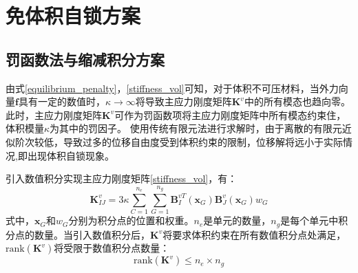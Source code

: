 \section{免体积自锁方案}
\subsection{罚函数法与缩减积分方案}

由式\eqref{equilibrium_penalty}，\eqref{stiffness_vol}可知，对于体积不可压材料，当外力向量$\boldsymbol f$具有一定的数值时，$\kappa \rightarrow \infty$将导致主应力刚度矩阵$\boldsymbol K^v$中的所有模态也趋向零。
此时，主应力刚度矩阵$\boldsymbol K^v$可作为罚函数项将主应力刚度矩阵中所有模态约束住，体积模量$\kappa$为其中的罚因子。
使用传统有限元法进行求解时，由于离散的有限元近似阶次较低，导致过多的位移自由度受到体积约束的限制，位移解将远小于实际情况,即出现体积自锁现象。

引入数值积分实现主应力刚度矩阵\eqref{stiffness_vol}，有：
\begin{equation}\label{integration}
    \boldsymbol K^v_{IJ} =  3\kappa \sum_{C=1}^{n_e}\sum_{G=1}^{n_g} \boldsymbol B^{vT}_I(\boldsymbol x_G) \boldsymbol B^v_J(\boldsymbol x_G) w_G
\end{equation}
式中，$\boldsymbol x_G$和$w_G$分别为积分点的位置和权重。$n_e$是单元的数量，$n_g$是每个单元中积分点的数量。当引入数值积分后，$\boldsymbol K^v$将要求体积约束在所有数值积分点处满足，$\mathrm{rank}(\boldsymbol K^v)$将受限于数值积分点数量：
\begin{equation}\label{rank}
    \mathrm{rank}(\boldsymbol K^v)\le n_e \times n_g
\end{equation}

